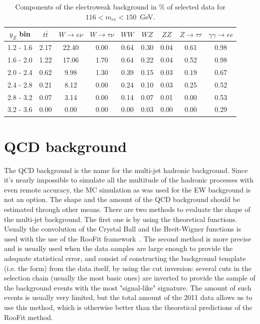 \begin{table}
\centering
\begin{tabular}{ c cccccccc } \hline \hline
 $y_Z$ bin & $t\bar t$ & $W \to e\nu$ & $W \to \tau\nu$ &  $WW$ & $WZ$ & $ZZ$ & $Z \to \tau\tau$  & $\gamma\gamma \to ee$\\  \hline
 1.2 -  1.6 &   2.17 &  22.40 &   0.00 &   0.64 &   0.30 &   0.04 &   0.61 &   0.98 \\
 1.6 -  2.0 &   1.22 &  17.06 &   1.70 &   0.64 &   0.22 &   0.04 &   0.52 &   0.98 \\
 2.0 -  2.4 &   0.62 &   9.98 &   1.30 &   0.39 &   0.15 &   0.03 &   0.19 &   0.67 \\
 2.4 -  2.8 &   0.21 &   8.12 &   0.00 &   0.24 &   0.10 &   0.03 &   0.25 &   0.52 \\
 2.8 -  3.2 &   0.07 &   3.14 &   0.00 &   0.14 &   0.07 &   0.01 &   0.00 &   0.53 \\
 3.2 -  3.6 &   0.00 &   0.00 &   0.00 &   0.00 &   0.03 &   0.00 &   0.00 &   0.29 \\
\hline \hline
\end{tabular}
\caption{Components of the electroweak background in \% of selected data for $116 < m_{ee} < 150$~GeV.}
\label{tab:bkg_ew_high}
\end{table}

\section{QCD background}

The QCD background is the name for the multi-jet hadronic background. Since it's nearly impossible to simulate all the multitude of the hadronic processes with even remote accuracy, the MC simulation as was used for the EW background is not an option. The shape and the amount of the QCD background should be estimated through other means. There are two methods to evaluate the shape of the multi-jet background. The first one is by using the theoretical functions. Usually the convolution of the Crystal Ball and the Breit-Wigner functions is used with the use of the RooFit framework~\cite{lib:bkg_roofit}. The second method is more precise and is usually used when the data samples are large enough to provide the adequate statistical error, and consist of constructing the background template (i.e. the form) from the data itself, by using the cut inversion: several cuts in the selection chain (usually the most basic ones) are inverted to provide the sample of the background events with the most "signal-like" signature. The amount of such events is usually very limited, but the total amount of the 2011 data allows us to use this method, which is otherwise better than the theoretical predictions of the RooFit method.

